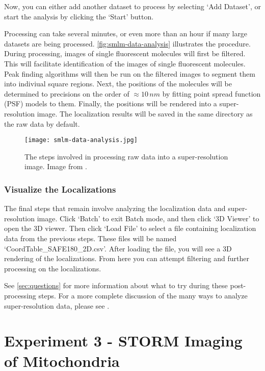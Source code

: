\documentclass[10pt,a4paper,oneside]{book}
\begin{document}
Now, you can either add another dataset to process by selecting `Add Dataset', or start the analysis by clicking the `Start' button.

Processing can take several minutes, or even more than an hour if many large datasets are being processed. \autoref{fig:smlm-data-analysis} illustrates the procedure. During processing, images of single fluorescent molecules will first be filtered. This will facilitate identification of the images of single fluorescent molecules. Peak finding algorithms will then be run on the filtered images to segment them into indiviual square regions. Next, the positions of the molecules will be determined to precisions on the order of $\approx 10 \, nm$ by fitting point spread function (PSF) models to them. Finally, the positions will be rendered into a super-resolution image. The localization results will be saved in the same directory as the raw data by default.

\begin{figure}
    \centering
    \texttt{[image: smlm-data-analysis.jpg]}
    \caption{The steps involved in processing raw data into a super-resolution image. Image from \cite{martens-frontiersinbioinformatics-2022}.}
    \label{fig:smlm-data-analysis}
\end{figure}

\subsubsection{Visualize the Localizations}

The final steps that remain involve analyzing the localization data and super-resolution image. Click `Batch' to exit Batch mode, and then click `3D Viewer' to open the 3D viewer. Then click `Load File' to select a file containing localization data from the previous steps. These files will be named `CoordTable\_SAFE180\_2D.csv'. After loading the file, you will see a 3D rendering of the localizations. From here you can attempt filtering and further processing on the localizations.

See \autoref{sec:questions} for more information about what to try during these post-processing steps. For a more complete discussion of the many ways to analyze super-resolution data, please see \cite{martens-frontiersinbioinformatics-2022}.

\section{Experiment 3 - STORM Imaging of Mitochondria}\label{sec:exp3}
\end{document}
